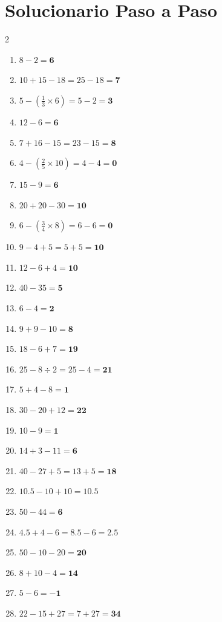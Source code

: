 \documentclass[11pt, letterpaper]{article}
\begin{document}
\newpage

\section*{Solucionario Paso a Paso}
\begin{multicols}{2}
	\small
	\begin{enumerate}[label=\textbf{\arabic*.}]
		\item $8 - 2 = \mathbf{6}$
		\item $10 + 15 - 18 = 25 - 18 = \mathbf{7}$
		\item $5 - (\frac{1}{3} \times 6) = 5 - 2 = \mathbf{3}$
		\item $12 - 6 = \mathbf{6}$
		\item $7 + 16 - 15 = 23 - 15 = \mathbf{8}$
		\item $4 - (\frac{2}{5} \times 10) = 4 - 4 = \mathbf{0}$
		\item $15 - 9 = \mathbf{6}$
		\item $20 + 20 - 30 = \mathbf{10}$
		\item $6 - (\frac{3}{4} \times 8) = 6 - 6 = \mathbf{0}$
		\item $9 - 4 + 5 = 5 + 5 = \mathbf{10}$
		\item $12 - 6 + 4 = \mathbf{10}$
		\item $40 - 35 = \mathbf{5}$
		\item $6 - 4 = \mathbf{2}$
		\item $9 + 9 - 10 = \mathbf{8}$
		\item $18 - 6 + 7 = \mathbf{19}$
		\item $25 - 8 \div 2 = 25 - 4 = \mathbf{21}$
		\item $5 + 4 - 8 = \mathbf{1}$
		\item $30 - 20 + 12 = \mathbf{22}$
		\item $10 - 9 = \mathbf{1}$
		\item $14 + 3 - 11 = \mathbf{6}$
		\item $40 - 27 + 5 = 13 + 5 = \mathbf{18}$
		\item $10.5 - 10 + 10 = \mathbf{10.5}$
		\item $50 - 44 = \mathbf{6}$
		\item $4.5 + 4 - 6 = 8.5 - 6 = \mathbf{2.5}$
		\item $50 - 10 - 20 = \mathbf{20}$
		\item $8 + 10 - 4 = \mathbf{14}$
		\item $5 - 6 = \mathbf{-1}$
		\item $22 - 15 + 27 = 7 + 27 = \mathbf{34}$

\end{enumerate}
\end{multicols}
\end{document}
